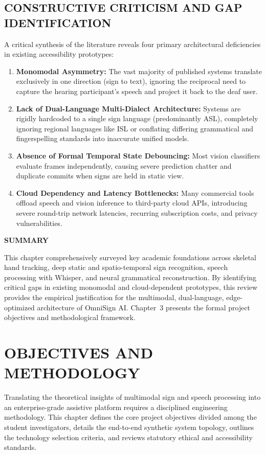 \documentclass[12pt,a4paper]{report}
\begin{document}
\section{CONSTRUCTIVE CRITICISM AND GAP IDENTIFICATION} \label{sec:lit-gaps}
A critical synthesis of the literature reveals four primary architectural deficiencies in existing accessibility prototypes:
\begin{enumerate}[noitemsep, topsep=2pt]
\item \textbf{Monomodal Asymmetry:} The vast majority of published systems translate exclusively in one direction (sign to text), ignoring the reciprocal need to capture the hearing participant's speech and project it back to the deaf user.
\item \textbf{Lack of Dual-Language Multi-Dialect Architecture:} Systems are rigidly hardcoded to a single sign language (predominantly ASL), completely ignoring regional languages like ISL or conflating differing grammatical and fingerspelling standards into inaccurate unified models.
\item \textbf{Absence of Formal Temporal State Debouncing:} Most vision classifiers evaluate frames independently, causing severe prediction chatter and duplicate commits when signs are held in static view.
\item \textbf{Cloud Dependency and Latency Bottlenecks:} Many commercial tools offload speech and vision inference to third-party cloud APIs, introducing severe round-trip network latencies, recurring subscription costs, and privacy vulnerabilities.
\end{enumerate}
\vspace{0.2cm}
\noindent\textbf{SUMMARY}\nopagebreak\par\vspace{0.1cm}
This chapter comprehensively surveyed key academic foundations across skeletal hand tracking, deep static and spatio-temporal sign recognition, speech processing with Whisper, and neural grammatical reconstruction. By identifying critical gaps in existing monomodal and cloud-dependent prototypes, this review provides the empirical justification for the multimodal, dual-language, edge-optimized architecture of OmniSign AI. Chapter~3 presents the formal project objectives and methodological framework.
\clearpage

\chapter{OBJECTIVES AND METHODOLOGY} \label{chap:obj}
Translating the theoretical insights of multimodal sign and speech processing into an enterprise-grade assistive platform requires a disciplined engineering methodology. This chapter defines the core project objectives divided among the student investigators, details the end-to-end synthetic system topology, outlines the technology selection criteria, and reviews statutory ethical and accessibility standards.
\end{document}
